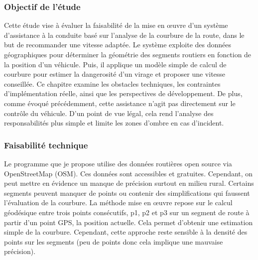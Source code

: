

\subsubsection{Objectif de l'étude}
Cette étude vise à évaluer la faisabilité de la mise en œuvre d’un système d’assistance à la conduite basé sur l’analyse de la courbure de la route, dans le but de recommander une vitesse adaptée. Le système exploite des données géographiques pour déterminer la géométrie des segments routiers en fonction de la position d’un véhicule. Puis, il applique un modèle simple de calcul de courbure pour estimer la dangerosité d’un virage et proposer une vitesse conseillée. Ce chapitre examine les obstacles techniques, les contraintes d’implémentation réelle, ainsi que les perspectives de développement.
De plus, comme évoqué précédemment, cette assistance n’agit pas directement sur le contrôle du véhicule. D’un point de vue légal, cela rend l’analyse des responsabilités plus simple et limite les zones d’ombre en cas d’incident.

\subsubsection{Faisabilité technique}
Le programme que je propose utilise des données routières open source via OpenStreetMap (OSM). Ces données sont accessibles et gratuites. Cependant, on peut mettre en évidence un manque de précision surtout en milieu rural. Certains segments peuvent manquer de points ou contenir des simplifications qui faussent l’évaluation de la courbure.
La méthode mise en œuvre repose sur le calcul géodésique entre trois points consécutifs, p1, p2 et p3 sur un segment de route à partir d'un point GPS, la position actuelle. Cela permet d’obtenir une estimation simple de la courbure.
Cependant, cette approche reste sensible à la densité des points sur les segments (peu de points donc cela implique une mauvaise précision).

